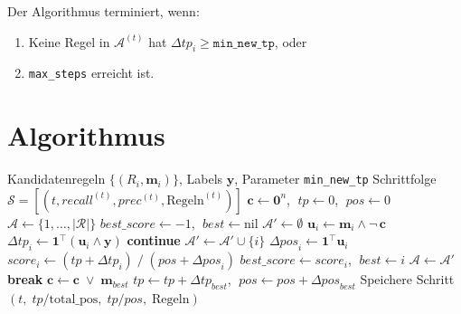 \documentclass[11pt,a4paper]{article}
\begin{document}
\noindent Der Algorithmus terminiert, wenn:
\begin{enumerate}[nosep]
  \item Keine Regel in $\mathcal{A}^{(t)}$ hat $\Delta\mathit{tp}_i \geq \texttt{min\_new\_tp}$, oder
  \item \texttt{max\_steps} erreicht ist.
\end{enumerate}

\section{Algorithmus}

\begin{algorithm}[H]
\caption{Greedy Set Cover}
\begin{algorithmic}[1]
\Require Kandidatenregeln $\{(R_i, \mathbf{m}_i)\}$, Labels $\mathbf{y}$, Parameter \texttt{min\_new\_tp}
\Ensure Schrittfolge $\mathcal{S} = [(t, \mathit{recall}^{(t)}, \mathit{prec}^{(t)}, \text{Regeln}^{(t)})]$
\State $\mathbf{c} \gets \mathbf{0}^n$, $\;\mathit{tp} \gets 0$, $\;\mathit{pos} \gets 0$
\State $\mathcal{A} \gets \{1, \dots, |\mathcal{R}|\}$ 
  \State $\mathit{best\_score} \gets -1$, $\;\mathit{best} \gets \text{nil}$
  \State $\mathcal{A}' \gets \emptyset$
    \State $\mathbf{u}_i \gets \mathbf{m}_i \wedge \neg\,\mathbf{c}$
    \State $\Delta\mathit{tp}_i \gets \mathbf{1}^\top(\mathbf{u}_i \wedge \mathbf{y})$
      \State \textbf{continue} 
    \EndIf
    \State $\mathcal{A}' \gets \mathcal{A}' \cup \{i\}$
    \State $\Delta\mathit{pos}_i \gets \mathbf{1}^\top \mathbf{u}_i$
    \State $\mathit{score}_i \gets (\mathit{tp} + \Delta\mathit{tp}_i) \;/\; (\mathit{pos} + \Delta\mathit{pos}_i)$
      \State $\mathit{best\_score} \gets \mathit{score}_i$, $\;\mathit{best} \gets i$
    \EndIf
  \EndFor
  \State $\mathcal{A} \gets \mathcal{A}'$
    \State \textbf{break} 
  \EndIf
  \State $\mathbf{c} \gets \mathbf{c} \;\vee\; \mathbf{m}_{\mathit{best}}$
  \State $\mathit{tp} \gets \mathit{tp} + \Delta\mathit{tp}_{\mathit{best}}$, $\;\mathit{pos} \gets \mathit{pos} + \Delta\mathit{pos}_{\mathit{best}}$
  \State Speichere Schritt $(t, \;\mathit{tp}/\text{total\_pos}, \;\mathit{tp}/\mathit{pos}, \;\text{Regeln})$
\EndFor
\end{algorithmic}
\end{algorithm}
\end{document}
